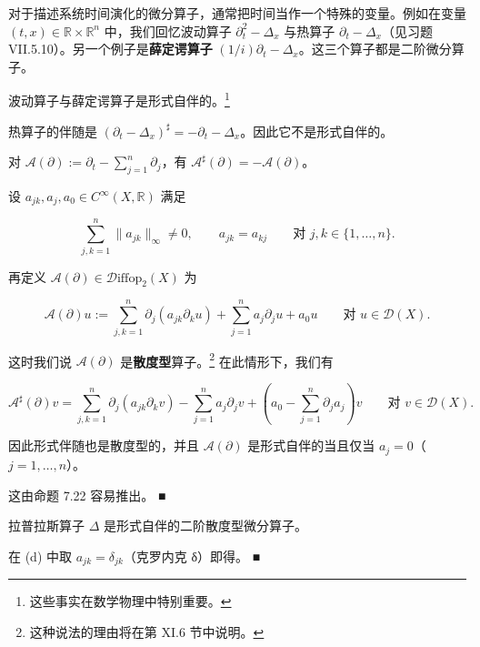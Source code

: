 对于描述系统时间演化的微分算子，通常把时间当作一个特殊的变量。例如在变量 $ (t, x) \in \mathbb{R} \times \mathbb{R}^n $ 中，我们回忆波动算子 $ \partial_t^2 - \Delta_x $ 与热算子 $ \partial_t - \Delta_x $（见习题 VII.5.10）。另一个例子是\textbf{薛定谔算子} $ (1/i)\partial_t - \Delta_x $。这三个算子都是二阶微分算子。

\begin{example}

\begin{items}
\item

波动算子与薛定谔算子是形式自伴的。\footnote{这些事实在数学物理中特别重要。}

\item

热算子的伴随是 $ (\partial_t - \Delta_x)^{\sharp} = -\partial_t - \Delta_x $。因此它不是形式自伴的。

\item

对 $ \mathcal{A}(\partial) := \partial_t - \sum_{j=1}^n \partial_j $，有 $ \mathcal{A}^{\sharp}(\partial) = -\mathcal{A}(\partial) $。

\item

设 $ a_{jk}, a_j, a_0 \in C^\infty(X, \mathbb{R}) $ 满足

\[
\sum_{j,k=1}^n \|a_{jk}\|_\infty \ne 0 , \qquad a_{jk} = a_{kj} \qquad \text{对 } j, k \in \{1,\dots,n\} .
\]

再定义 $ \mathcal{A}(\partial) \in \mathcal{D}\mathrm{iffop}_2(X) $ 为

\[
\mathcal{A}(\partial)u := \sum_{j,k=1}^n \partial_j(a_{jk}\partial_k u) + \sum_{j=1}^n a_j\partial_j u + a_0 u \qquad \text{对 } u \in \mathcal{D}(X) .
\]

这时我们说 $ \mathcal{A}(\partial) $ 是\textbf{散度型}算子。\footnote{这种说法的理由将在第 XI.6 节中说明。} 在此情形下，我们有

\[
\mathcal{A}^{\sharp}(\partial)v = \sum_{j,k=1}^n \partial_j(a_{jk}\partial_k v) - \sum_{j=1}^n a_j\partial_j v + \left( a_0 - \sum_{j=1}^n \partial_j a_j \right) v \qquad \text{对 } v \in \mathcal{D}(X) .
\]

因此形式伴随也是散度型的，并且 $ \mathcal{A}(\partial) $ 是形式自伴的当且仅当 $ a_j = 0 $（$ j = 1,\dots,n $）。

\proofhead
这由命题 7.22 容易推出。 \nobreak\hspace{0.35em}■
\item

拉普拉斯算子 $ \Delta $ 是形式自伴的二阶散度型微分算子。

\proofhead
在 (d) 中取 $ a_{jk} = \delta_{jk} $（克罗内克 δ）即得。 \nobreak\hspace{0.35em}■
\end{items}

\end{example}

